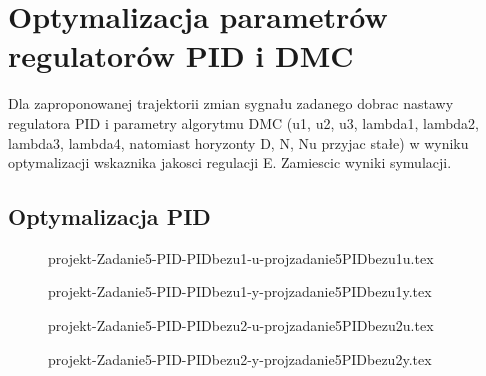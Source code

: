 \section{Optymalizacja parametrów regulatorów PID i DMC}
\label{projekt:zad5}

%    

Dla zaproponowanej trajektorii zmian sygnału zadanego dobrac nastawy regulatora
PID i parametry algorytmu DMC (u1, u2, u3, lambda1, lambda2, lambda3, lambda4, natomiast horyzonty D,
N, Nu przyjac stałe) w wyniku optymalizacji wskaznika jakosci regulacji E. Zamiescic
wyniki symulacji.

\subsection{Optymalizacja PID}

\begin{figure}[H] 
    \centering
    
    \caption{projekt-Zadanie5-PID-PIDbezu1-u-projzadanie5PIDbezu1u.tex}
    \label{projekt:zad5:figure:projzadanie5PIDbezu1u}
\end{figure}

\begin{figure}[H] 
    \centering
    
    \caption{projekt-Zadanie5-PID-PIDbezu1-y-projzadanie5PIDbezu1y.tex}
    \label{projekt:zad5:figure:projzadanie5PIDbezu1y}
\end{figure}

\begin{figure}[H] 
    \centering
    
    \caption{projekt-Zadanie5-PID-PIDbezu2-u-projzadanie5PIDbezu2u.tex}
    \label{projekt:zad5:figure:projzadanie5PIDbezu2u}
\end{figure}

\begin{figure}[H] 
    \centering
    
    \caption{projekt-Zadanie5-PID-PIDbezu2-y-projzadanie5PIDbezu2y.tex}
    \label{projekt:zad5:figure:projzadanie5PIDbezu2y}
\end{figure}

